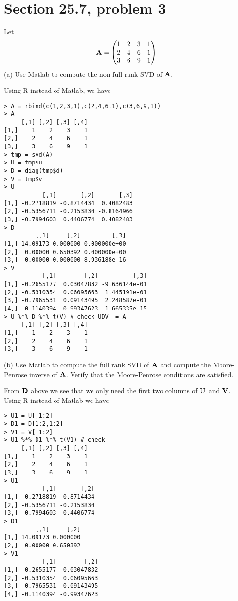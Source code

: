 \section{Section 25.7, problem 3}
Let
$${\bf A}=\left(\begin{matrix}
1 & 2 & 3 & 1\cr
2 & 4 & 6 & 1\cr
3 & 6 & 9 & 1
\end{matrix}\right)
$$
(a) Use Matlab to compute the non-full rank SVD of $\bf A$.

\bigskip
\noindent
Using R instead of Matlab, we have
\begin{verbatim}
> A = rbind(c(1,2,3,1),c(2,4,6,1),c(3,6,9,1))
> A
     [,1] [,2] [,3] [,4]
[1,]    1    2    3    1
[2,]    2    4    6    1
[3,]    3    6    9    1
> tmp = svd(A)
> U = tmp$u
> D = diag(tmp$d)
> V = tmp$v
> U
           [,1]       [,2]       [,3]
[1,] -0.2718819 -0.8714434  0.4082483
[2,] -0.5356711 -0.2153830 -0.8164966
[3,] -0.7994603  0.4406774  0.4082483
> D
         [,1]     [,2]         [,3]
[1,] 14.09173 0.000000 0.000000e+00
[2,]  0.00000 0.650392 0.000000e+00
[3,]  0.00000 0.000000 8.936188e-16
> V
           [,1]        [,2]          [,3]
[1,] -0.2655177  0.03047832 -9.636144e-01
[2,] -0.5310354  0.06095663  1.445191e-01
[3,] -0.7965531  0.09143495  2.248587e-01
[4,] -0.1140394 -0.99347623 -1.665335e-15
> U %*% D %*% t(V) # check UDV' = A
     [,1] [,2] [,3] [,4]
[1,]    1    2    3    1
[2,]    2    4    6    1
[3,]    3    6    9    1
\end{verbatim}

\bigskip
\noindent
(b) Use Matlab to compute the full rank SVD of $\bf A$
and compute the Moore-Penrose inverse of $\bf A$.
Verify that the Moore-Penrose conditions are satisfied.

\bigskip
\noindent
From $\bf D$ above we see that we only need the first two columns
of $\bf U$ and $\bf V$.
Using R instead of Matlab we have
\begin{verbatim}
> U1 = U[,1:2]
> D1 = D[1:2,1:2]
> V1 = V[,1:2]
> U1 %*% D1 %*% t(V1) # check
     [,1] [,2] [,3] [,4]
[1,]    1    2    3    1
[2,]    2    4    6    1
[3,]    3    6    9    1
> U1
           [,1]       [,2]
[1,] -0.2718819 -0.8714434
[2,] -0.5356711 -0.2153830
[3,] -0.7994603  0.4406774
> D1
         [,1]     [,2]
[1,] 14.09173 0.000000
[2,]  0.00000 0.650392
> V1
           [,1]        [,2]
[1,] -0.2655177  0.03047832
[2,] -0.5310354  0.06095663
[3,] -0.7965531  0.09143495
[4,] -0.1140394 -0.99347623
\end{verbatim}

